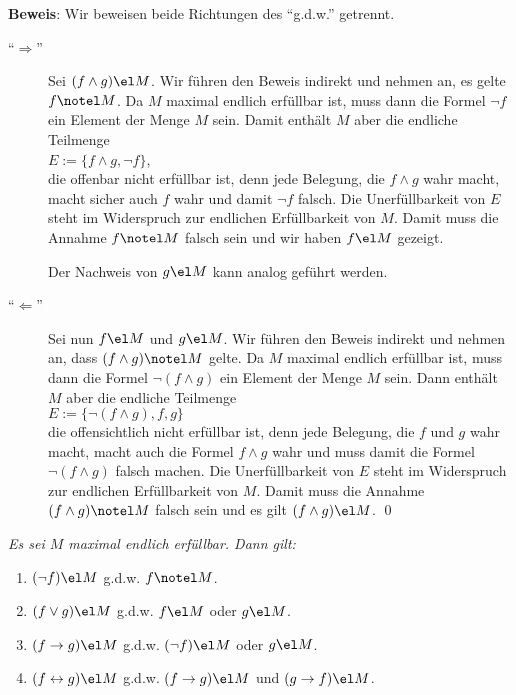 \noindent
\textbf{Beweis}: Wir beweisen beide Richtungen des ``g.d.w.'' getrennt.
\begin{description}
\item[``$\Rightarrow$''] Sei $(f \wedge g) \el M$.  Wir führen den Beweis indirekt und
  nehmen an, es gelte $f \notel M$. Da
  $M$ maximal endlich erfüllbar ist, muss dann die Formel $\neg f$ ein Element der Menge
  $M$ sein.  Damit enthält $M$ aber die endliche Teilmenge 
  \\[0.2cm]
  \hspace*{1.3cm}
  $E := \{ f \wedge g, \neg f\}$, 
  \\[0.2cm]
  die offenbar nicht erfüllbar ist, denn jede Belegung, die $f \wedge g$ wahr macht, macht
  sicher auch $f$ wahr und damit $\neg f$ falsch.  Die Unerfüllbarkeit von $E$ steht im
  Widerspruch zur endlichen Erfüllbarkeit von $M$.  Damit muss die Annahme $f \notel M$
  falsch sein und wir haben $f \el M$ gezeigt. 

  Der Nachweis von $g \el M$ kann analog geführt werden.
\item[``$\Leftarrow$''] Sei nun $f \el M$ und $g \el M$.  
  Wir führen den Beweis indirekt und nehmen an, dass $(f \wedge g) \notel M$ gelte.  Da $M$
  maximal endlich erfüllbar ist, muss dann die Formel $\neg (f \wedge g)$ ein Element der
  Menge $M$ sein.  Dann enthält $M$ aber die endliche Teilmenge
  \\[0.2cm]
  \hspace*{1.3cm}
  $E := \{ \neg (f \wedge g), f, g \}$
  \\[0.2cm]
  die offensichtlich nicht erfüllbar ist, denn jede Belegung, die $f$ und $g$ wahr macht,
  macht auch die Formel $f \wedge g$ wahr und muss damit die Formel $\neg (f \wedge g)$
  falsch machen.  Die Unerfüllbarkeit von $E$ steht im Widerspruch zur endlichen
  Erfüllbarkeit von $M$.  Damit muss die Annahme $(f \wedge g) \notel M$ falsch sein und
  es gilt $(f \wedge g) \el M$. \qed
\end{description}

\begin{Satz} \label{satz29}
{\em
  Es sei $M$ maximal endlich erfüllbar. Dann gilt:
  \begin{enumerate}
  \item $(\neg f) \el M$ \quad g.d.w. $f \notel M$.
  \item $(f \vee g) \el M$ \quad g.d.w. $f \el M$ oder $g \el M$.
  \item $(f \rightarrow g) \el M$ \quad g.d.w. $(\neg f) \el M$ oder $g \el M$.
  \item $(f \leftrightarrow g) \el M$ \quad g.d.w. 
        $(f \rightarrow g) \el M$ und $(g \rightarrow f) \el M$.
  \end{enumerate}
}
\end{Satz}

